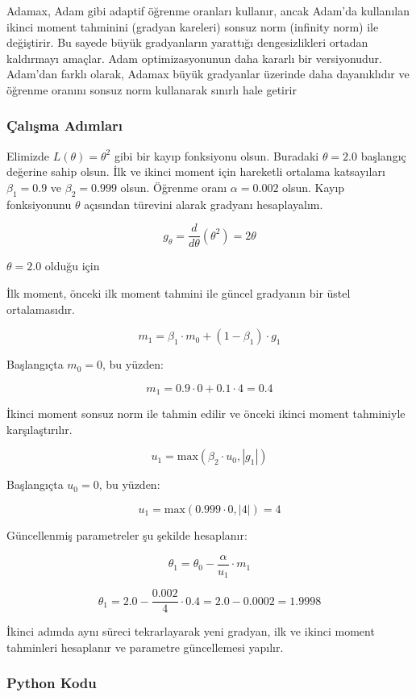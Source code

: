 Adamax, Adam gibi adaptif öğrenme oranları kullanır, ancak Adam'da kullanılan ikinci moment tahminini (gradyan kareleri) sonsuz norm (infinity norm) ile değiştirir. Bu sayede büyük gradyanların yarattığı dengesizlikleri ortadan kaldırmayı amaçlar. Adam optimizasyonunun daha kararlı bir versiyonudur. Adam'dan farklı olarak, Adamax büyük gradyanlar üzerinde daha dayanıklıdır ve öğrenme oranını sonsuz norm kullanarak sınırlı hale getirir

\subsubsection{Çalışma Adımları}

Elimizde $L(\theta) = \theta^2$ gibi bir kayıp fonksiyonu olsun. Buradaki $\theta = 2.0$ başlangıç değerine sahip olsun. İlk ve ikinci moment için hareketli ortalama katsayıları $\beta_1 = 0.9$ ve $\beta_2 = 0.999$ olsun. Öğrenme oranı $\alpha = 0.002$ olsun. Kayıp fonksiyonunu $\theta$ açısından türevini alarak gradyanı hesaplayalım.

\[ g_{\theta} = \frac{d}{d \theta} (\theta^2) = 2 \theta \]

$\theta = 2.0$ olduğu için

İlk moment, önceki ilk moment tahmini ile güncel gradyanın bir üstel ortalamasıdır.

\[ m_1 = \beta_1 \cdot m_0 + (1 - \beta_1) \cdot g_1 \]

Başlangıçta $m_0 = 0$, bu yüzden:

\[ m_1 = 0.9 \cdot 0 + 0.1 \cdot 4 = 0.4 \]

İkinci moment sonsuz norm ile tahmin edilir ve önceki ikinci moment tahminiyle karşılaştırılır.

\[ u_1 = \text{max}(\beta_2 \cdot u_0, |g_1|) \]

Başlangıçta $u_0 = 0$, bu yüzden:

\[ u_1 = \text{max}(0.999 \cdot 0, |4|) = 4 \]

Güncellenmiş parametreler şu şekilde hesaplanır:

\[ \theta_1 = \theta_0 - \frac{\alpha}{u_1} \cdot m_1 \]

\[ \theta_1 = 2.0 - \frac{0.002}{4} \cdot 0.4 = 2.0 - 0.0002 = 1.9998 \]

İkinci adımda aynı süreci tekrarlayarak yeni gradyan, ilk ve ikinci moment tahminleri hesaplanır ve parametre güncellemesi yapılır.

\subsubsection{Python Kodu}

